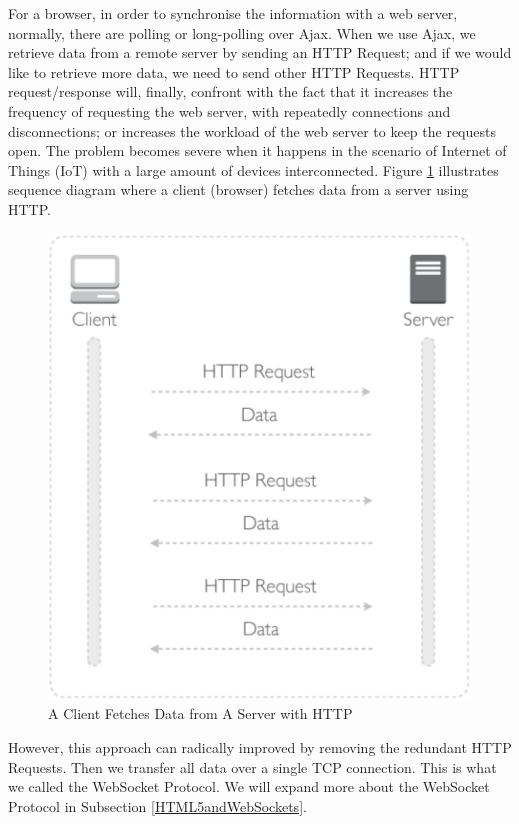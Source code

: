 For a browser, in order to synchronise the information with a web server, normally, there are polling or long-polling over Ajax. When we use Ajax, we retrieve data from a remote server by sending an HTTP Request; and if we would like to retrieve more data, we need to send other HTTP Requests. HTTP request/response will, finally, confront with the fact that it increases the frequency of requesting the web server, with repeatedly connections and disconnections; or increases the workload of the web server to keep the requests open. The problem becomes severe when it happens in the scenario of Internet of Things (IoT) with a large amount of devices interconnected. Figure \ref{fig:client-server-http} illustrates sequence diagram where a client (browser) fetches data from a server using HTTP.

\begin{figure}[ht]
  \begin{center}
    \includegraphics[width=1\textwidth]{images/client-server-http.pdf}
    \caption{A Client Fetches Data from A Server with HTTP}
    \label{fig:client-server-http}
  \end{center}
\end{figure}


However, this approach can radically improved by removing the redundant HTTP Requests. Then we transfer all data over a single TCP connection. This is what we called the WebSocket Protocol. We will expand more about the WebSocket Protocol in Subsection \ref{HTML5andWebSockets}.

